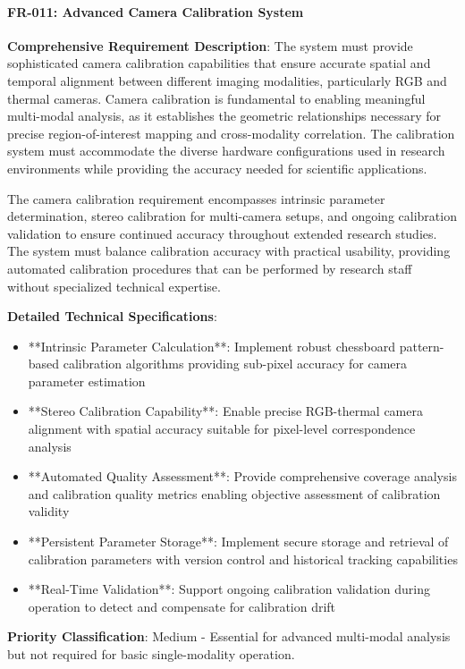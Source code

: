 \documentclass[11pt,a4paper]{report}
\begin{document}
\paragraph{FR-011: Advanced Camera Calibration System}

\textbf{Comprehensive Requirement Description}: The system must provide sophisticated camera calibration capabilities that
ensure accurate spatial and temporal alignment between different imaging modalities, particularly RGB and thermal
cameras. Camera calibration is fundamental to enabling meaningful multi-modal analysis, as it establishes the geometric
relationships necessary for precise region-of-interest mapping and cross-modality correlation. The calibration system
must accommodate the diverse hardware configurations used in research environments while providing the accuracy needed
for scientific applications.

The camera calibration requirement encompasses intrinsic parameter determination, stereo calibration for multi-camera
setups, and ongoing calibration validation to ensure continued accuracy throughout extended research studies. The system
must balance calibration accuracy with practical usability, providing automated calibration procedures that can be
performed by research staff without specialized technical expertise.

\textbf{Detailed Technical Specifications}:

\begin{itemize}
\item **Intrinsic Parameter Calculation**: Implement robust chessboard pattern-based calibration algorithms providing
  sub-pixel accuracy for camera parameter estimation
\item **Stereo Calibration Capability**: Enable precise RGB-thermal camera alignment with spatial accuracy suitable for
  pixel-level correspondence analysis
\item **Automated Quality Assessment**: Provide comprehensive coverage analysis and calibration quality metrics enabling
  objective assessment of calibration validity
\item **Persistent Parameter Storage**: Implement secure storage and retrieval of calibration parameters with version
  control and historical tracking capabilities
\item **Real-Time Validation**: Support ongoing calibration validation during operation to detect and compensate for
  calibration drift

\end{itemize}
\textbf{Priority Classification}: Medium - Essential for advanced multi-modal analysis but not required for basic
single-modality operation.
\end{document}
